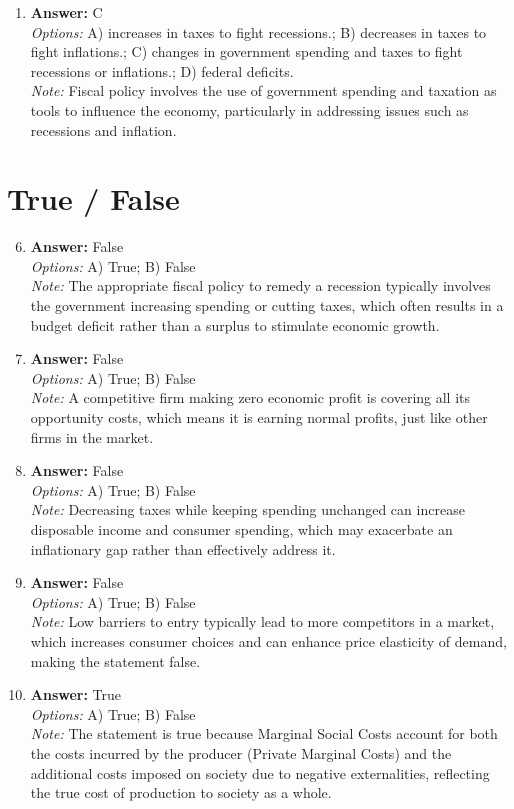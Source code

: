 \documentclass[12pt]{article}
\begin{document}
\begin{enumerate}[label=\arabic*.]
\item \textbf{Answer:} C
\\ \textit{Options:} A) increases in taxes to fight recessions.; B) decreases in taxes to fight inflations.; C) changes in government spending and taxes to fight recessions or inflations.; D) federal deficits.
\\ \textit{Note:} Fiscal policy involves the use of government spending and taxation as tools to influence the economy, particularly in addressing issues such as recessions and inflation.
\end{enumerate}

\section*{True / False}
\begin{enumerate}[label=\arabic*.]
\setcounter{enumi}{5}
\item \textbf{Answer:} False
\\ \textit{Options:} A) True; B) False
\\ \textit{Note:} The appropriate fiscal policy to remedy a recession typically involves the government increasing spending or cutting taxes, which often results in a budget deficit rather than a surplus to stimulate economic growth.
\item \textbf{Answer:} False
\\ \textit{Options:} A) True; B) False
\\ \textit{Note:} A competitive firm making zero economic profit is covering all its opportunity costs, which means it is earning normal profits, just like other firms in the market.
\item \textbf{Answer:} False
\\ \textit{Options:} A) True; B) False
\\ \textit{Note:} Decreasing taxes while keeping spending unchanged can increase disposable income and consumer spending, which may exacerbate an inflationary gap rather than effectively address it.
\item \textbf{Answer:} False
\\ \textit{Options:} A) True; B) False
\\ \textit{Note:} Low barriers to entry typically lead to more competitors in a market, which increases consumer choices and can enhance price elasticity of demand, making the statement false.
\item \textbf{Answer:} True
\\ \textit{Options:} A) True; B) False
\\ \textit{Note:} The statement is true because Marginal Social Costs account for both the costs incurred by the producer (Private Marginal Costs) and the additional costs imposed on society due to negative externalities, reflecting the true cost of production to society as a whole.
\end{enumerate}
\end{document}
